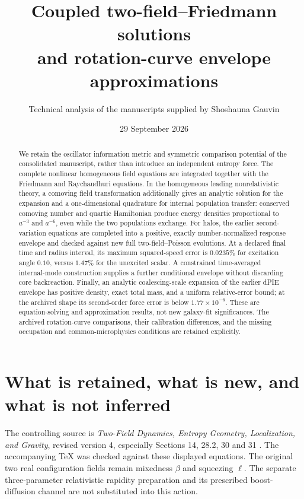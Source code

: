 \documentclass[11pt]{article}
\title{Coupled two-field--Friedmann solutions\\and rotation-curve envelope approximations}
\author{Technical analysis of the manuscripts supplied by Shoshauna Gauvin}
\date{29 September 2026}
\begin{document}
\maketitle
\begin{abstract}
We retain the oscillator information metric and symmetric comparison potential of the consolidated manuscript, rather than introduce an independent entropy force. The complete nonlinear homogeneous field equations are integrated together with the Friedmann and Raychaudhuri equations. In the homogeneous leading nonrelativistic theory, a comoving field transformation additionally gives an analytic solution for the expansion and a one-dimensional quadrature for internal population transfer: conserved comoving number and quartic Hamiltonian produce energy densities proportional to $a^{-3}$ and $a^{-6}$, even while the two populations exchange. For halos, the earlier second-variation equations are completed into a positive, exactly number-normalized response envelope and checked against new full two-field--Poisson evolutions. At a declared final time and radius interval, its maximum squared-speed error is $0.0235\%$ for excitation angle $0.10$, versus $1.47\%$ for the unexcited scalar. A constrained time-averaged internal-mode construction supplies a further conditional envelope without discarding core backreaction. Finally, an analytic coalescing-scale expansion of the earlier dPIE envelope has positive density, exact total mass, and a uniform relative-error bound; at the archived shape its second-order force error is below $1.77\times10^{-6}$. These are equation-solving and approximation results, not new galaxy-fit significances. The archived rotation-curve comparisons, their calibration differences, and the missing occupation and common-microphysics conditions are retained explicitly.
\end{abstract}
\tableofcontents
\newpage

\section{What is retained, what is new, and what is not inferred}
The controlling source is \emph{Two-Field Dynamics, Entropy Geometry, Localization, and Gravity}, revised version 4, especially Sections 14, 28.2, 30 and 31 \cite{consolidated}. The accompanying TeX was checked against these displayed equations. The original two real configuration fields remain mixedness $\beta$ and squeezing $\ell$. The separate three-parameter relativistic rapidity preparation and its prescribed boost-diffusion channel are not substituted into this action.
\end{document}
